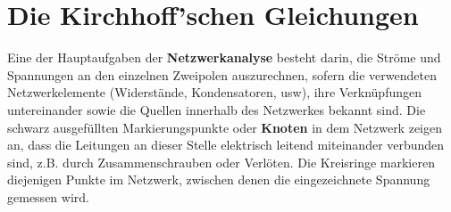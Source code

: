 \section{Die Kirchhoff'schen Gleichungen}
Eine der Hauptaufgaben der \textbf{Netzwerkanalyse} besteht darin, die Ströme und Spannungen an den einzelnen Zweipolen auszurechnen, sofern die verwendeten Netzwerkelemente (Widerstände, Kondensatoren, usw), ihre Verknüpfungen untereinander sowie die Quellen innerhalb des Netzwerkes bekannt sind. 
\newline\newline
Die schwarz ausgefüllten Markierungspunkte oder \textbf{Knoten} in dem Netzwerk zeigen an, dass die Leitungen an dieser Stelle elektrisch leitend miteinander verbunden sind, z.B. durch Zusammenschrauben oder Verlöten. Die Kreisringe markieren diejenigen Punkte im Netzwerk, zwischen denen die eingezeichnete Spannung gemessen wird.
